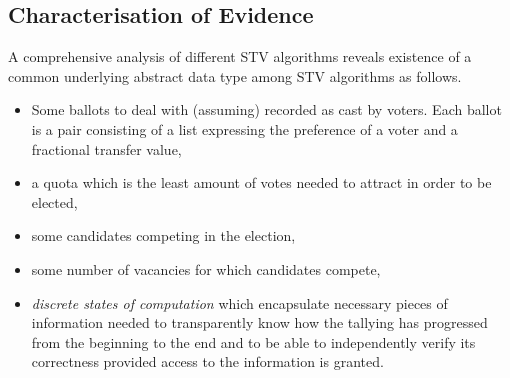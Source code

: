 \documentclass[10pt,conference]{IEEEtran}
\begin{document}



\subsection{Characterisation of Evidence}
A comprehensive analysis of different STV algorithms reveals existence of a common underlying abstract data type among STV algorithms as follows. 
\begin{itemize}
\item Some ballots to deal with (assuming) recorded as cast by voters. Each ballot is a pair consisting of a list expressing the preference of a voter and a fractional transfer value,
\item a quota which is the least amount of votes needed to attract in order to be elected, 
\item some candidates competing in the election, 
\item some number of vacancies for which candidates compete,
\item \emph{discrete states of computation} which encapsulate necessary  pieces of information needed to transparently know how the tallying has progressed from the beginning to the end and to be able to independently verify its correctness provided access to the information is granted. 
\end{itemize}
\end{document}
